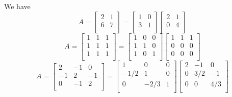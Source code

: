 \documentclass[a4paper]{article}
\begin{document}
We have
\[
	A = 
	\begin{bmatrix}
		2 & 1 \\
		6 & 7 \\
	\end{bmatrix}
	=
	\begin{bmatrix}
		1 & 0 \\
		3 & 1 \\
	\end{bmatrix}
	\begin{bmatrix}
		2 & 1 \\
		0 & 4 \\
	\end{bmatrix}
\]
\[
	A = 
	\begin{bmatrix}
		1 & 1 & 1 \\
		1 & 1 & 1 \\
		1 & 1 & 1 \\
	\end{bmatrix}
	=
	\begin{bmatrix}
		1 & 0 & 0 \\
		1 & 1 & 0 \\
		1 & 0 & 1 \\
	\end{bmatrix}
	\begin{bmatrix}
		1 & 1 & 1 \\
		0 & 0 & 0 \\
		0 & 0 & 0 \\
	\end{bmatrix}
\]
\[
	A = 
	\begin{bmatrix}
		2 & -1 & 0 \\
		-1 & 2 & -1 \\
		0 & -1 & 2 \\
	\end{bmatrix}
	=
	\begin{bmatrix}
		1 & 0 & 0 \\
		-1/2 & 1 & 0 \\
		0 & -2/3 & 1 \\
	\end{bmatrix}
	\begin{bmatrix}
		2 & -1 & 0 \\
		0 & 3/2 & -1 \\
		0 & 0 & 4/3 \\
	\end{bmatrix}
\]

\end{document}
